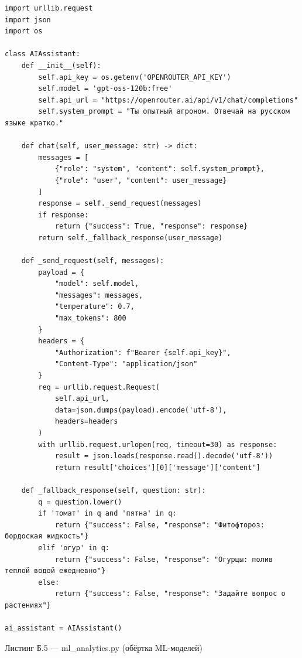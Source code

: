 \documentclass[14pt, a4paper]{extarticle}
\begin{document}
\begin{verbatim}
import urllib.request
import json
import os

class AIAssistant:
    def __init__(self):
        self.api_key = os.getenv('OPENROUTER_API_KEY')
        self.model = 'gpt-oss-120b:free'
        self.api_url = "https://openrouter.ai/api/v1/chat/completions"
        self.system_prompt = "Ты опытный агроном. Отвечай на русском языке кратко."
    
    def chat(self, user_message: str) -> dict:
        messages = [
            {"role": "system", "content": self.system_prompt},
            {"role": "user", "content": user_message}
        ]
        response = self._send_request(messages)
        if response:
            return {"success": True, "response": response}
        return self._fallback_response(user_message)
    
    def _send_request(self, messages):
        payload = {
            "model": self.model,
            "messages": messages,
            "temperature": 0.7,
            "max_tokens": 800
        }
        headers = {
            "Authorization": f"Bearer {self.api_key}",
            "Content-Type": "application/json"
        }
        req = urllib.request.Request(
            self.api_url,
            data=json.dumps(payload).encode('utf-8'),
            headers=headers
        )
        with urllib.request.urlopen(req, timeout=30) as response:
            result = json.loads(response.read().decode('utf-8'))
            return result['choices'][0]['message']['content']
    
    def _fallback_response(self, question: str):
        q = question.lower()
        if 'томат' in q and 'пятна' in q:
            return {"success": False, "response": "Фитофтороз: бордоская жидкость"}
        elif 'огур' in q:
            return {"success": False, "response": "Огурцы: полив теплой водой ежедневно"}
        else:
            return {"success": False, "response": "Задайте вопрос о растениях"}

ai_assistant = AIAssistant()
\end{verbatim}

\newpage


Листинг Б.5 — ml_analytics.py (обёртка ML-моделей)
\end{document}
